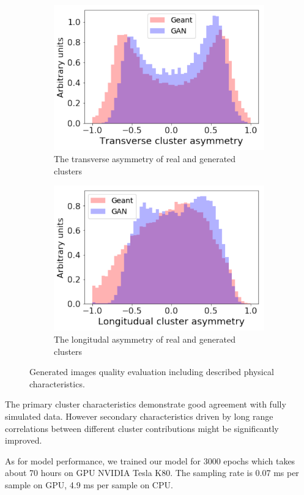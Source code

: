 \begin{figure}
\begin{subfigure}[b]{0.35\textwidth}
    \includegraphics[width=1\textwidth]{figures/transverseAsymmetry.pdf}
    \caption{The transverse asymmetry of real and generated clusters}
  \end{subfigure}\hspace{0.2\textwidth}
  \begin{subfigure}[b]{0.35\textwidth}
    \centering
    \includegraphics[width=1\textwidth]{figures/longAsymmetry.pdf}
    \caption{The longitudal asymmetry of real and generated clusters}
  \end{subfigure}
  \caption{Generated images quality evaluation including described physical characteristics.}\label{fig:quality}  
\end{figure}

The primary cluster characteristics  demonstrate good agreement with
fully simulated data. However secondary characteristics driven by
long range correlations between different cluster contributions might
be significantly improved.  




As for model performance, we trained our model for 3000 epochs which takes about 70 hours on GPU NVIDIA Tesla K80. The sampling rate is 0.07 ms per sample on GPU, 4.9 ms per sample on CPU.

